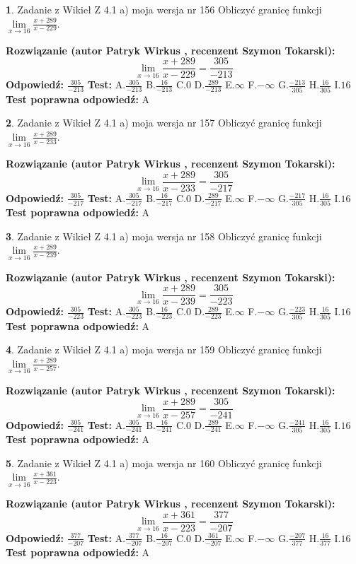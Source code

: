 \documentclass[12pt, a4paper]{article}
\theoremstyle{definition} %
\newtheorem{zad}{}
\newcommand{\zadStart}[1]{\begin{zad}#1\newline}
\newcommand{\zadStop}{\end{zad}}
\newcommand{\rozwStart}[2]{\noindent \textbf{Rozwiązanie (autor #1 , recenzent #2): }\newline}
\newcommand{\rozwStop}{\newline}
\newcommand{\odpStart}{\noindent \textbf{Odpowiedź:}\newline}
\newcommand{\odpStop}{\newline}
\newcommand{\testStart}{\noindent \textbf{Test:}\newline}
\newcommand{\testStop}{\newline}
\newcommand{\kluczStart}{\noindent \textbf{Test poprawna odpowiedź:}\newline}
\newcommand{\kluczStop}{\newline}
\begin{document}
\zadStart{Zadanie z Wikieł Z 4.1 a) moja wersja nr 156}
Obliczyć granicę funkcji $\lim\limits_{x\to16}\frac{x+289}{x-229}$.
\zadStop
\rozwStart{Patryk Wirkus}{Szymon Tokarski}
$$\lim\limits_{x\to16}\frac{x+289}{x-229} = \frac{305}{-213}$$
\rozwStop
\odpStart
$\frac{305}{-213}$
\odpStop
\testStart
A.$\frac{305}{-213}$
B.$\frac{16}{-213}$
C.$0$
D.$\frac{289}{-213}$
E.$\infty$
F.$-\infty$
G.$\frac{-213}{305}$
H.$\frac{16}{305}$
I.$16$
\testStop
\kluczStart
A
\kluczStop



\zadStart{Zadanie z Wikieł Z 4.1 a) moja wersja nr 157}
Obliczyć granicę funkcji $\lim\limits_{x\to16}\frac{x+289}{x-233}$.
\zadStop
\rozwStart{Patryk Wirkus}{Szymon Tokarski}
$$\lim\limits_{x\to16}\frac{x+289}{x-233} = \frac{305}{-217}$$
\rozwStop
\odpStart
$\frac{305}{-217}$
\odpStop
\testStart
A.$\frac{305}{-217}$
B.$\frac{16}{-217}$
C.$0$
D.$\frac{289}{-217}$
E.$\infty$
F.$-\infty$
G.$\frac{-217}{305}$
H.$\frac{16}{305}$
I.$16$
\testStop
\kluczStart
A
\kluczStop



\zadStart{Zadanie z Wikieł Z 4.1 a) moja wersja nr 158}
Obliczyć granicę funkcji $\lim\limits_{x\to16}\frac{x+289}{x-239}$.
\zadStop
\rozwStart{Patryk Wirkus}{Szymon Tokarski}
$$\lim\limits_{x\to16}\frac{x+289}{x-239} = \frac{305}{-223}$$
\rozwStop
\odpStart
$\frac{305}{-223}$
\odpStop
\testStart
A.$\frac{305}{-223}$
B.$\frac{16}{-223}$
C.$0$
D.$\frac{289}{-223}$
E.$\infty$
F.$-\infty$
G.$\frac{-223}{305}$
H.$\frac{16}{305}$
I.$16$
\testStop
\kluczStart
A
\kluczStop



\zadStart{Zadanie z Wikieł Z 4.1 a) moja wersja nr 159}
Obliczyć granicę funkcji $\lim\limits_{x\to16}\frac{x+289}{x-257}$.
\zadStop
\rozwStart{Patryk Wirkus}{Szymon Tokarski}
$$\lim\limits_{x\to16}\frac{x+289}{x-257} = \frac{305}{-241}$$
\rozwStop
\odpStart
$\frac{305}{-241}$
\odpStop
\testStart
A.$\frac{305}{-241}$
B.$\frac{16}{-241}$
C.$0$
D.$\frac{289}{-241}$
E.$\infty$
F.$-\infty$
G.$\frac{-241}{305}$
H.$\frac{16}{305}$
I.$16$
\testStop
\kluczStart
A
\kluczStop



\zadStart{Zadanie z Wikieł Z 4.1 a) moja wersja nr 160}
Obliczyć granicę funkcji $\lim\limits_{x\to16}\frac{x+361}{x-223}$.
\zadStop
\rozwStart{Patryk Wirkus}{Szymon Tokarski}
$$\lim\limits_{x\to16}\frac{x+361}{x-223} = \frac{377}{-207}$$
\rozwStop
\odpStart
$\frac{377}{-207}$
\odpStop
\testStart
A.$\frac{377}{-207}$
B.$\frac{16}{-207}$
C.$0$
D.$\frac{361}{-207}$
E.$\infty$
F.$-\infty$
G.$\frac{-207}{377}$
H.$\frac{16}{377}$
I.$16$
\testStop
\kluczStart
A
\kluczStop
\end{document}

